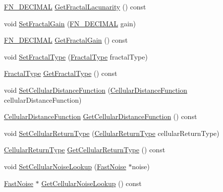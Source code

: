 \begin{DoxyCompactItemize}
\item 
\mbox{\hyperlink{_fast_noise_8h_a75a9ef6d2541c4921815b885bfd449c3}{F\+N\+\_\+\+D\+E\+C\+I\+M\+AL}} \mbox{\hyperlink{class_fast_noise_a19d233571cf78b15e19197c4b28c384c}{Get\+Fractal\+Lacunarity}} () const
\item 
void \mbox{\hyperlink{class_fast_noise_abbd1dd9839957f18f5eaf8b2b61610ac}{Set\+Fractal\+Gain}} (\mbox{\hyperlink{_fast_noise_8h_a75a9ef6d2541c4921815b885bfd449c3}{F\+N\+\_\+\+D\+E\+C\+I\+M\+AL}} gain)
\item 
\mbox{\hyperlink{_fast_noise_8h_a75a9ef6d2541c4921815b885bfd449c3}{F\+N\+\_\+\+D\+E\+C\+I\+M\+AL}} \mbox{\hyperlink{class_fast_noise_a6f3583a9cca358b3490b0d4bfee6a894}{Get\+Fractal\+Gain}} () const
\item 
void \mbox{\hyperlink{class_fast_noise_ad5ebb22802d87f7eb425a711658e47d8}{Set\+Fractal\+Type}} (\mbox{\hyperlink{class_fast_noise_a20a2d45a468fa10a7c6a94e22c2f3d30}{Fractal\+Type}} fractal\+Type)
\item 
\mbox{\hyperlink{class_fast_noise_a20a2d45a468fa10a7c6a94e22c2f3d30}{Fractal\+Type}} \mbox{\hyperlink{class_fast_noise_ad65fd4033ae2177be857fc186e9d6315}{Get\+Fractal\+Type}} () const
\item 
void \mbox{\hyperlink{class_fast_noise_aa47dea942e8c687892b5bad6d652883f}{Set\+Cellular\+Distance\+Function}} (\mbox{\hyperlink{class_fast_noise_a457e58d0da6dbe486deb5a21a3db52bf}{Cellular\+Distance\+Function}} cellular\+Distance\+Function)
\item 
\mbox{\hyperlink{class_fast_noise_a457e58d0da6dbe486deb5a21a3db52bf}{Cellular\+Distance\+Function}} \mbox{\hyperlink{class_fast_noise_a16af57f7010f7770d3b866619d89599c}{Get\+Cellular\+Distance\+Function}} () const
\item 
void \mbox{\hyperlink{class_fast_noise_ac643a011759d70ed71651774f53f1c65}{Set\+Cellular\+Return\+Type}} (\mbox{\hyperlink{class_fast_noise_a942d73b97b870138c9a07249d5a57737}{Cellular\+Return\+Type}} cellular\+Return\+Type)
\item 
\mbox{\hyperlink{class_fast_noise_a942d73b97b870138c9a07249d5a57737}{Cellular\+Return\+Type}} \mbox{\hyperlink{class_fast_noise_a6336a4871db63d0f30d01d784412574e}{Get\+Cellular\+Return\+Type}} () const
\item 
void \mbox{\hyperlink{class_fast_noise_a9fcbaf1407149a2caa6b1aabcf9b3db1}{Set\+Cellular\+Noise\+Lookup}} (\mbox{\hyperlink{class_fast_noise}{Fast\+Noise}} $\ast$noise)
\item 
\mbox{\hyperlink{class_fast_noise}{Fast\+Noise}} $\ast$ \mbox{\hyperlink{class_fast_noise_a4d6be0952a9b9a46d3772d8256e4ad37}{Get\+Cellular\+Noise\+Lookup}} () const

\end{DoxyCompactItemize}
